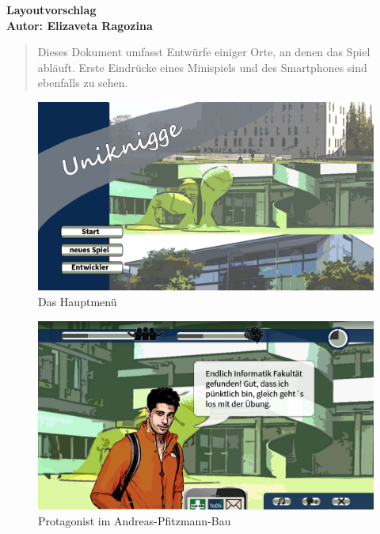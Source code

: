 \documentclass[a4paper,10pt]{article}
\begin{document}
\vspace*{1cm}

{\bfseries \large Layoutvorschlag \\[1mm]
\normalfont Autor: Elizaveta Ragozina}					%

\vspace{1cm}

\begin{abstract}
	Dieses Dokument umfasst Entwürfe einiger Orte, an denen das Spiel abläuft. Erste Eindrücke eines Minispiels und des Smartphones sind ebenfalls zu sehen.
\end{abstract}

\newpage

\begin{figure}
	\centering
	\includegraphics[width=\textwidth]{./figures/mainmenu.png}
	\caption{Das Hauptmenü}
\end{figure}

\begin{figure}
	\centering
	\includegraphics[width=\textwidth]{./figures/apb.png}
	\caption{Protagonist im Andreas-Pfitzmann-Bau}
\end{figure}
\end{document}
